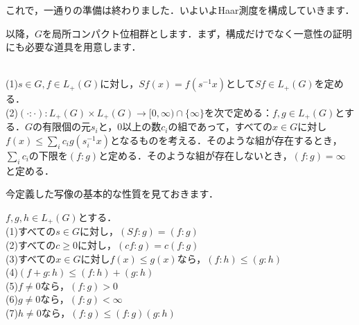 これで，一通りの準備は終わりました．いよいよHaar測度を構成していきます．

以降，$G$を局所コンパクト位相群とします．まず，構成だけでなく一意性の証明にも必要な道具を用意します．

\begin{defi}\label{17}
\leavevmode \\
(1)$s \in G, f \in L_{+}(G)$に対し，$Sf(x)=f(s^{-1}x)$として$Sf \in L_{+}(G)$を定める．\\
(2)$(\cdot \colon \cdot ) \colon L_{+}(G) \times L_{+}(G) \to [0, \infty) \cap \{ \infty \}$を次で定める：$f, g \in L_{+}(G)$とする．$G$の有限個の元$s_i$と，0以上の数$c_i$の組であって，すべての$x \in G$に対し$f(x) \le \sum_{i}c_{i} g(s_{i}^{-1}x)$となるものを考える．そのような組が存在するとき，$\sum_{i}c_i$の下限を$(f \colon g)$と定める．そのような組が存在しないとき，$(f \colon g)=\infty$と定める．
\end{defi}
今定義した写像の基本的な性質を見ておきます．
\begin{prop}\label{18}
$f, g, h \in L_{+}(G)$とする．\\
(1)すべての$s \in G$に対し，$(Sf \colon g)=(f \colon g)$\\
(2)すべての$c \ge 0$に対し，$(cf \colon g)=c(f \colon g)$\\
(3)すべての$x \in G$に対し$f(x) \le g(x)$なら，$(f \colon h) \le (g \colon h)$\\
(4)$(f+g \colon h) \le (f \colon h)+(g \colon h)$\\
(5)$f \ne 0$なら，$( f \colon g ) > 0$\\
(6)$g \ne 0$なら，$( f \colon g ) < \infty $\\
(7)$h \ne 0$なら，$( f \colon g ) \le (f \colon g ) (g \colon h )$
\end{prop}
